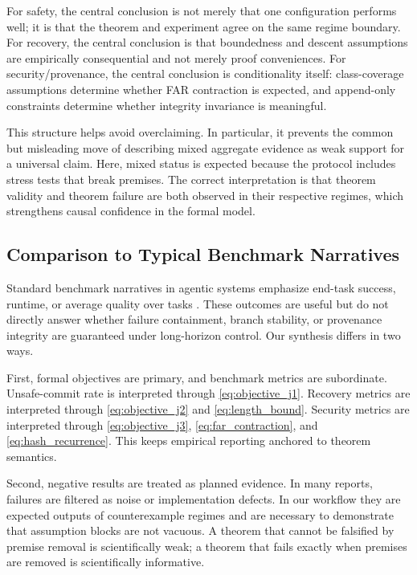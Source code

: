 \documentclass{article} %
\begin{document}
For safety, the central conclusion is not merely that one configuration performs well; it is that the theorem and experiment agree on the same regime boundary. For recovery, the central conclusion is that boundedness and descent assumptions are empirically consequential and not merely proof conveniences. For security/provenance, the central conclusion is conditionality itself: class-coverage assumptions determine whether FAR contraction is expected, and append-only constraints determine whether integrity invariance is meaningful.

This structure helps avoid overclaiming. In particular, it prevents the common but misleading move of describing mixed aggregate evidence as weak support for a universal claim. Here, mixed status is expected because the protocol includes stress tests that break premises. The correct interpretation is that theorem validity and theorem failure are both observed in their respective regimes, which strengthens causal confidence in the formal model.

\subsection{Comparison to Typical Benchmark Narratives}
Standard benchmark narratives in agentic systems emphasize end-task success, runtime, or average quality over tasks \citep{song2026,jin2025,ferrag2025}. These outcomes are useful but do not directly answer whether failure containment, branch stability, or provenance integrity are guaranteed under long-horizon control. Our synthesis differs in two ways.

First, formal objectives are primary, and benchmark metrics are subordinate. Unsafe-commit rate is interpreted through \eqref{eq:objective_j1}. Recovery metrics are interpreted through \eqref{eq:objective_j2} and \eqref{eq:length_bound}. Security metrics are interpreted through \eqref{eq:objective_j3}, \eqref{eq:far_contraction}, and \eqref{eq:hash_recurrence}. This keeps empirical reporting anchored to theorem semantics.

Second, negative results are treated as planned evidence. In many reports, failures are filtered as noise or implementation defects. In our workflow they are expected outputs of counterexample regimes and are necessary to demonstrate that assumption blocks are not vacuous. A theorem that cannot be falsified by premise removal is scientifically weak; a theorem that fails exactly when premises are removed is scientifically informative.
\end{document}
